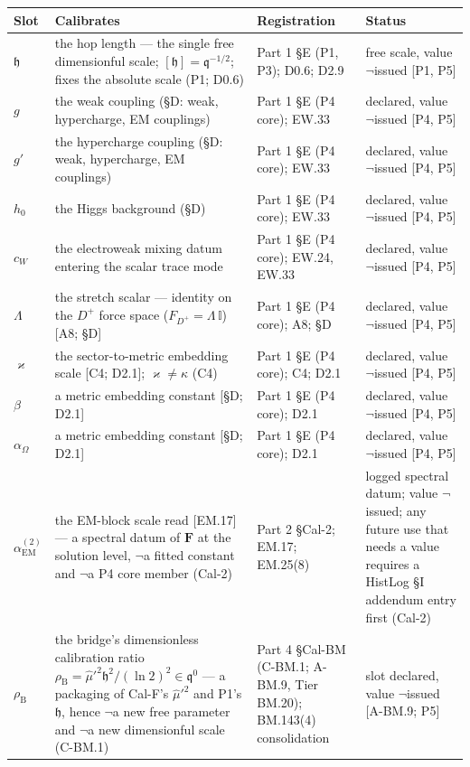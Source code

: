 \documentclass[11pt,openany]{report}
\theoremstyle{canonplain}
\theoremstyle{canondef}
\begin{document}
\begin{longtable}{@{}p{}p{}p{}p{}@{}}
\toprule
\textbf{Slot} & \textbf{Calibrates} & \textbf{Registration} & \textbf{Status} \\
\midrule
\endhead
$\mathfrak h$ & the hop length — the single free dimensionful scale; $[\mathfrak h]=\mathfrak q^{-1/2}$; fixes the absolute scale (P1; D0.6) & Part 1 §E (P1, P3); D0.6; D2.9 & free scale, value $\neg$issued [P1, P5] \\
$g$ & the weak coupling (§D: weak, hypercharge, EM couplings) & Part 1 §E (P4 core); EW.33 & declared, value $\neg$issued [P4, P5] \\
$g'$ & the hypercharge coupling (§D: weak, hypercharge, EM couplings) & Part 1 §E (P4 core); EW.33 & declared, value $\neg$issued [P4, P5] \\
$h_0$ & the Higgs background (§D) & Part 1 §E (P4 core); EW.33 & declared, value $\neg$issued [P4, P5] \\
$c_W$ & the electroweak mixing datum entering the scalar trace mode & Part 1 §E (P4 core); EW.24, EW.33 & declared, value $\neg$issued [P4, P5] \\
$\Lambda$ & the stretch scalar — identity on the $D^+$ force space ($F_{D^+}=\Lambda\,\mathbb I$) [A8; §D] & Part 1 §E (P4 core); A8; §D & declared, value $\neg$issued [P4, P5] \\
$\varkappa$ & the sector-to-metric embedding scale [C4; D2.1]; $\varkappa\ne\kappa$ (C4) & Part 1 §E (P4 core); C4; D2.1 & declared, value $\neg$issued [P4, P5] \\
$\beta$ & a metric embedding constant [§D; D2.1] & Part 1 §E (P4 core); D2.1 & declared, value $\neg$issued [P4, P5] \\
$\alpha_\Omega$ & a metric embedding constant [§D; D2.1] & Part 1 §E (P4 core); D2.1 & declared, value $\neg$issued [P4, P5] \\
$\alpha_{\mathrm{EM}}^{(2)}$ & the EM-block scale read [EM.17] — a spectral datum of $\mathbf F$ at the solution level, $\neg$a fitted constant and $\neg$a P4 core member (Cal-2) & Part 2 §Cal-2; EM.17; EM.25(8) & logged spectral datum; value $\neg$issued; any future use that needs a value requires a HistLog §I addendum entry first (Cal-2) \\
$\rho_{\mathrm B}$ & the bridge's dimensionless calibration ratio $\rho_{\mathrm B}=\hat\mu'^2\mathfrak h^2/(\ln2)^2\in\mathfrak q^0$ — a packaging of Cal-F's $\hat\mu'^2$ and P1's $\mathfrak h$, hence $\neg$a new free parameter and $\neg$a new dimensionful scale (C-BM.1) & Part 4 §Cal-BM (C-BM.1; A-BM.9, Tier BM.20); BM.143(4) consolidation & slot declared, value $\neg$issued [A-BM.9; P5] \\

\end{longtable}
\end{document}
